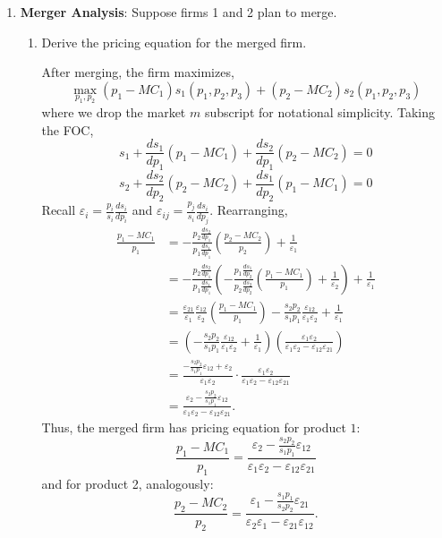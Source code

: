 \documentclass{article}
\begin{document}
\begin{enumerate}
\item \textbf{Merger Analysis}: Suppose firms 1 and 2 plan to merge.
\begin{enumerate}

\item Derive the pricing equation for the merged firm.

\begin{answer}
After merging, the firm maximizes,
$$\max_{p_{1},p_{2}} (p_{1}-MC_{1})s_{1}(p_{1},p_{2},p_{3}) + (p_{2}-MC_{2})s_{2}(p_{1},p_{2},p_{3})$$
where we drop the market $m$ subscript for notational simplicity. Taking the FOC,
$$s_{1}+\frac{ds_{1}}{dp_{1}}(p_{1}-MC_{1}) + \frac{ds_{2}}{dp_{1}}(p_2 - MC_2)=0$$
$$s_{2}+\frac{ds_{2}}{dp_{2}}(p_{2}-MC_{2}) + \frac{ds_{1}}{dp_{2}}(p_1 - MC_1)=0$$
Recall $\varepsilon_i = \frac{p_i}{s_i}\frac{d s_i}{d p_i}$ and $\varepsilon_{ij} = \frac{p_j}{s_i}\frac{d s_i}{d p_j}$. Rearranging,
\begin{align*}
    \frac{p_1-MC_1}{p_1} &= -\frac{p_2\frac{ds_2}{dp_1}}{p_1\frac{ds_1}{dp_1}}\left( \frac{p_2-MC_2}{p_2}\right) + \frac{1}{\varepsilon_1} \\
    &= -\frac{p_2\frac{ds_2}{dp_1}}{p_1\frac{ds_1}{dp_1}}\left( -\frac{p_1\frac{ds_1}{dp_2}}{p_2\frac{ds_2}{dp_2}}\left( \frac{p_1-MC_1}{p_1}\right) + \frac{1}{\varepsilon_2} \right) + \frac{1}{\varepsilon_1} \\
    &= \frac{\varepsilon_{21}}{\varepsilon_1}
    \frac{\varepsilon_{12}}{\varepsilon_2}
    \left( \frac{p_1-MC_1}{p_1}\right) - \frac{s_2p_2}{s_1p_1}\frac{\varepsilon_{12}}{\varepsilon_1\varepsilon_2}  + \frac{1}{\varepsilon_1} \\
    &= \left(- \frac{s_2p_2}{s_1p_1}\frac{\varepsilon_{12}}{\varepsilon_1\varepsilon_2}  +\frac{1}{\varepsilon_1}\right)\left(\frac{\varepsilon_1\varepsilon_2}{\varepsilon_1\varepsilon_2 - \varepsilon_{12}\varepsilon_{21}} \right) \\
    &= \frac{-\frac{s_2p_2}{s_1p_1}\varepsilon_{12}+\varepsilon_2}{\varepsilon_1\varepsilon_2}\cdot \frac{\varepsilon_1\varepsilon_2}{\varepsilon_1\varepsilon_2 - \varepsilon_{12}\varepsilon_{21}}  \\
    &= \frac{\varepsilon_2-\frac{s_2p_2}{s_1p_1}\varepsilon_{12}}{\varepsilon_1\varepsilon_2 - \varepsilon_{12}\varepsilon_{21}}.
\end{align*}
Thus, the merged firm has pricing equation for product $1$: 
\begin{equation}
    \frac{p_1-MC_1}{p_1} = \frac{\varepsilon_2-\frac{s_2p_2}{s_1p_1}\varepsilon_{12}}{\varepsilon_1\varepsilon_2 - \varepsilon_{12}\varepsilon_{21}}
\end{equation}
and for product 2, analogously: 
\begin{equation}
    \frac{p_2-MC_2}{p_2} = \frac{\varepsilon_1-\frac{s_1p_1}{s_2p_2}\varepsilon_{21}}{\varepsilon_2\varepsilon_1 - \varepsilon_{21}\varepsilon_{12}}.
\end{equation}
\end{answer}


\end{enumerate}
\end{enumerate}
\end{document}
